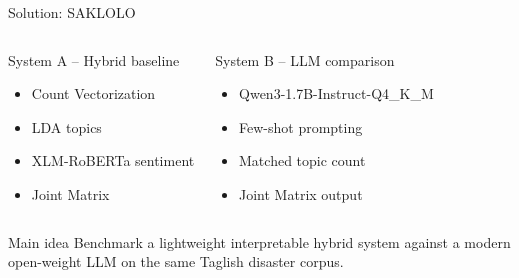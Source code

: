 \documentclass[aspectratio=169,10pt]{beamer}
\begin{document}
	
	\begin{frame}{Solution: SAKLOLO}
		
		\begin{columns}[T]
			
			
			\begin{block}{System A -- Hybrid baseline}
				\begin{itemize}
					\item Count Vectorization
					\item LDA topics
					\item XLM-RoBERTa sentiment
					\item Joint Matrix
				\end{itemize}
			\end{block}
			
			
			\begin{block}{System B -- LLM comparison}
				\begin{itemize}
					\item Qwen3-1.7B-Instruct-Q4\_K\_M
					\item Few-shot prompting
					\item Matched topic count
					\item Joint Matrix output
				\end{itemize}
			\end{block}
			
		\end{columns}
		
		\vspace{1mm}
		
		\begin{alertblock}{Main idea}
			Benchmark a lightweight interpretable hybrid system against a modern open-weight LLM on the same Taglish disaster corpus.
		\end{alertblock}
		
	\end{frame}
	
\end{document}
